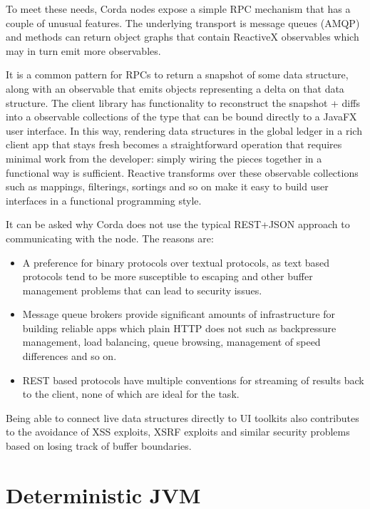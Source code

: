 \documentclass{article}
\begin{document}
To meet these needs, Corda nodes expose a simple RPC mechanism that has a couple of unusual features. The
underlying transport is message queues (AMQP) and methods can return object graphs that contain ReactiveX
observables\cite{Rx} which may in turn emit more observables.

It is a common pattern for RPCs to return a snapshot of some data structure, along with an observable that emits
objects representing a delta on that data structure. The client library has functionality to reconstruct the
snapshot + diffs into a observable collections of the type that can be bound directly to a JavaFX user interface.
In this way, rendering data structures in the global ledger in a rich client app that stays fresh becomes a
straightforward operation that requires minimal work from the developer: simply wiring the pieces together in a
functional way is sufficient. Reactive transforms over these observable collections such as mappings, filterings,
sortings and so on make it easy to build user interfaces in a functional programming style.

It can be asked why Corda does not use the typical REST+JSON approach to communicating with the node. The reasons
are:

\begin{itemize}
\item A preference for binary protocols over textual protocols, as text based protocols tend to be more
susceptible to escaping and other buffer management problems that can lead to security issues.
\item Message queue brokers provide significant amounts of infrastructure for building reliable apps
which plain HTTP does not such as backpressure management, load balancing, queue browsing, management of speed
differences and so on.
\item REST based protocols have multiple conventions for streaming of results back to the client, none of which
are ideal for the task.
\end{itemize}

Being able to connect live data structures directly to UI toolkits also contributes to the avoidance of XSS
exploits, XSRF exploits and similar security problems based on losing track of buffer boundaries.

\section{Deterministic JVM}\label{sec:djvm}
\end{document}
